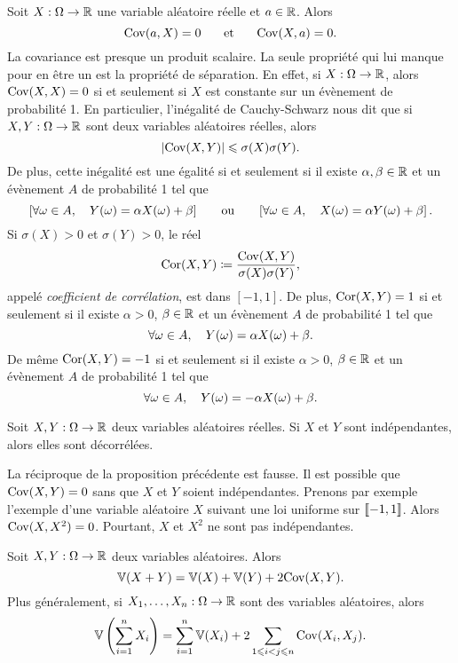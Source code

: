 \documentclass{magnolia}
\begin{document}
\begin{remarques}
\remarque Soit $X:\Omega\to\mathbb{R}$ une variable aléatoire réelle et $a\in\mathbb{R}$. Alors
  \[{\rm Cov}(a,X)=0 \quad\quad\!\text{et}\quad\!\quad {\rm Cov}(X,a)=0.\]
\remarque La covariance est presque un produit scalaire. La seule propriété qui lui manque
  pour en être un est la propriété de séparation. En effet, si $X:\Omega\to\mathbb{R}$, alors
  ${\rm Cov}(X,X)=0$ si et seulement si $X$ est constante sur un évènement de probabilité 1.
\remarque En particulier, l'inégalité de Cauchy-Schwarz nous dit que  si $X,Y:\Omega\to\mathbb{R}$ sont
  deux variables aléatoires réelles, alors
  \[\left|{\rm Cov}(X,Y)\right|\leqslant\sigma(X)\sigma(Y).\]
  De plus, cette inégalité est une égalité si et seulement si il existe $\alpha,\beta\in\mathbb{R}$
  et un évènement $A$ de probabilité 1 tel que
  \[\left[\forall \omega\in A,\quad Y(\omega)=\alpha X(\omega)+\beta\right] \quad\quad\!\text{ou}\quad\!\quad
    \left[\forall \omega\in A,\quad X(\omega)=\alpha Y(\omega)+\beta\right].\]
\remarque Si $\sigma(X)>0$ et $\sigma(Y)>0$, le réel
  \[{\rm Cor}(X,Y)\coloneqq\frac{{\rm Cov}(X,Y)}{\sigma(X)\sigma(Y)},\]
  appelé \emph{coefficient de corrélation}, est dans $[-1,1]$. De plus,
  ${\rm Cor}(X, Y)=1$ si et seulement si il existe $\alpha>0$, $\beta\in\mathbb{R}$ et
  un évènement $A$ de probabilité 1 tel que
  \[\forall \omega\in A,\quad Y(\omega)=\alpha X(\omega)+\beta.\]
  De même ${\rm Cor}(X, Y)=-1$ si et seulement si il existe $\alpha>0$, $\beta\in\mathbb{R}$ et
  un évènement $A$ de probabilité 1 tel que
  \[\forall \omega\in A,\quad Y(\omega)=-\alpha X(\omega)+\beta.\]
\end{remarques}

\begin{proposition}
Soit $X,Y:\Omega\to\mathbb{R}$ deux variables aléatoires réelles. Si $X$ et $Y$ sont
indépendantes, alors elles sont décorrélées.
\end{proposition}

\begin{remarqueUnique}
\remarque La réciproque de la proposition précédente est fausse. Il est possible que
  ${\rm Cov}(X,Y)=0$ sans que $X$ et $Y$ soient indépendantes. Prenons par exemple
  l'exemple d'une variable aléatoire $X$ suivant une loi uniforme sur $\left\llbracket -1,1\right\rrbracket$.
  Alors ${\rm Cov}(X,X^2)=0$. Pourtant, $X$ et $X^2$ ne sont pas indépendantes. 
\end{remarqueUnique}

\begin{proposition}
Soit $X,Y:\Omega\to\mathbb{R}$ deux variables aléatoires. Alors
\[\mathbb{V}(X+Y)=\mathbb{V}(X)+\mathbb{V}(Y)+2{\rm Cov}(X,Y).\]
Plus généralement, si $X_1,\ldots,X_n:\Omega\to\mathbb{R}$ sont des variables aléatoires, alors
\[\mathbb{V}\left(\sum_{i=1}^n X_i\right)=\sum_{i=1}^n \mathbb{V}(X_i)+
  2\sum_{1\leqslant i<j\leqslant n} {\rm Cov}(X_i,X_j).\]
\end{proposition}
\end{document}
